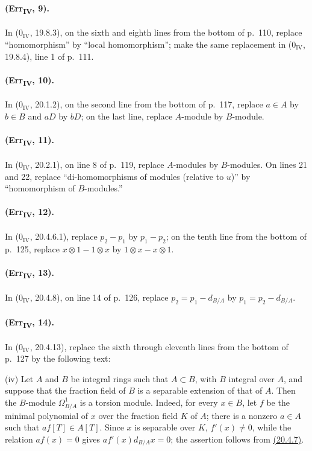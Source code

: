 \paragraph{(Err\textsubscript{IV}, 9).}
In ($0_{\mathrm{IV}}$, 19.8.3), on the sixth and eighth lines from the
bottom of p.~110, replace ``homomorphism'' by ``local homomorphism'';
make the same replacement in ($0_{\mathrm{IV}}$, 19.8.4), line 1 of
p.~111.

\paragraph{(Err\textsubscript{IV}, 10).}
In ($0_{\mathrm{IV}}$, 20.1.2), on the second line from the bottom of
p.~117, replace $a\in A$ by $b\in B$ and $aD$ by $bD$; on the last line,
replace $A$-module by $B$-module.

\paragraph{(Err\textsubscript{IV}, 11).}
In ($0_{\mathrm{IV}}$, 20.2.1), on line 8 of p.~119, replace
$A$-modules by $B$-modules.  On lines 21 and 22, replace
``di-homomorphisms of modules (relative to $u$)'' by ``homomorphism of
$B$-modules.''

\paragraph{(Err\textsubscript{IV}, 12).}
In ($0_{\mathrm{IV}}$, 20.4.6.1), replace $p_2-p_1$ by $p_1-p_2$; on
the tenth line from the bottom of p.~125, replace
$x\otimes1-1\otimes x$ by $1\otimes x-x\otimes1$.

\paragraph{(Err\textsubscript{IV}, 13).}
In ($0_{\mathrm{IV}}$, 20.4.8), on line 14 of p.~126, replace
$p_2=p_1-d_{B/A}$ by $p_1=p_2-d_{B/A}$.

\paragraph{(Err\textsubscript{IV}, 14).}
In ($0_{\mathrm{IV}}$, 20.4.13), replace the sixth through eleventh
lines from the bottom of p.~127 by the following text:

\medskip
\noindent
(iv) Let $A$ and $B$ be integral rings such that $A\subset B$, with
$B$ integral over $A$, and suppose that the fraction field of $B$ is a
separable extension of that of $A$.  Then the $B$-module
$\Omega^1_{B/A}$ is a torsion module.  Indeed, for every $x\in B$, let
$f$ be the minimal polynomial of $x$ over the fraction field $K$ of
$A$; there is a nonzero $a\in A$ such that $af[T]\in A[T]$.  Since $x$
is separable over $K$, $f'(x)\neq0$, while the relation $af(x)=0$
gives $af'(x)d_{B/A}x=0$; the assertion follows from {\hyperlink{ega4.c04.cor.20-4-7}{(20.4.7)}}.

